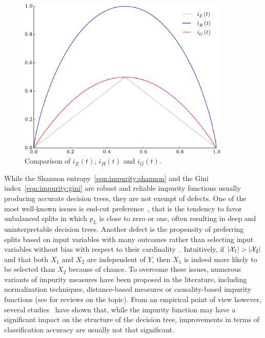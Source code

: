 \begin{figure}
\centering
\includegraphics[width=0.9\textwidth]{figures/ch3_impurity_comparison.pdf}
\caption{Comparison of $i_E(t)$, $i_H(t)$ and $i_G(t)$.}
\label{fig:3:toy:impurity:comparison}
\end{figure}

While the Shannon entropy~\ref{eqn:impurity:shannon} and the Gini
index~\ref{eqn:impurity:gini} are robust and reliable impurity functions
usually producing accurate decision trees, they are not exempt of defects. One
of the most well-known issues is end-cut
preference~\citep{morgan:1973,breiman:1984}, that is the tendency to favor
unbalanced splits in which $p_L$ is close to zero or one,  often resulting in
deep and uninterpretable decision trees. Another defect is the propensity of
preferring splits based on input variables with many outcomes rather than
selecting input variables without bias with respect to their
cardinality~\citep{quinlan:1986,strobl:2007}. Intuitively, if $|{\cal X}_1| >
|{\cal X}_2|$ and that both $X_1$ and $X_2$ are independent of $Y$, then $X_1$
is indeed more likely to be selected than $X_2$  because of chance. To overcome
these issues, numerous variants of impurity measures have been proposed in the
literature, including normalization techniques, distance-based measures or
causality-based impurity functions (see
\citep{wehenkel:1996,zighed:2000,maimon:2005} for reviews on the topic). From
an empirical point of view however,  several
studies~\citep{mingers:1989b,miyakawa:1989,mantaras:1991} have shown that,
while the impurity function may have a significant impact on the structure of
the decision tree, improvements in terms of classification accuracy are usually
not that significant.

